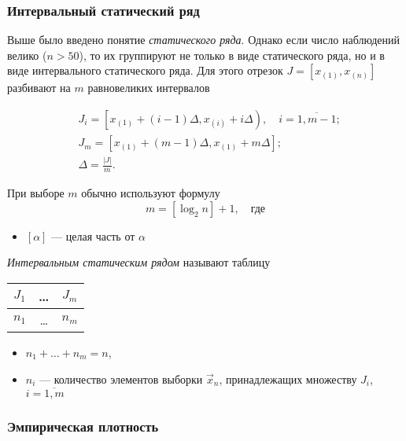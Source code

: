 \subsubsection{Интервальный статический ряд}

Выше было введено понятие \emph{статического ряда}. Однако если число наблюдений велико ($n > 50$), то их группируют не только в виде статического ряда, но и в виде интервального статического ряда. Для этого отрезок $J = [x_{(1)}, x_{(n)}]$ разбивают на $m$ равновеликих интервалов

\begin{align*}
	&J_i = \left[ x_{(1)} + (i - 1)\Delta, x_{(i)} + i\Delta \right), \quad i = \overline{1, m-1};
	\\
	&J_m = \left[ x_{(1)} + (m-1)\Delta, x_{(1)} + m\Delta  \right];
	\\
	&\Delta = \frac{|J|}{m}.
\end{align*}

\begin{rem}
	При выборе $m$ обычно используют формулу
	\begin{equation}
		m = [ \log_2 n ] + 1, \quad \text{где}
	\end{equation}
	\begin{itemize}
		\item $[\alpha]$ --- целая часть от $\alpha$
	\end{itemize}
\end{rem}

\begin{defn}
	\emph{Интервальным статическим рядом} называют таблицу
	\begin{center}
			\begin{tabular}{| c | c | c |}
				\hline
				$J_1$ & \ldots & $J_m$ \\
				\hline
				$n_1$ & \ldots & $n_m$ \\
				\hline
			\end{tabular}
	\end{center}
	\begin{itemize}
		\item $n_1 + \dots + n_m = n$,
		\item $n_i$ --- количество элементов выборки $\vec{x}_n$, принадлежащих множеству $J_i$, $i = \overline{1, m}$
	\end{itemize}
\end{defn}


\subsubsection{Эмпирическая плотность}

